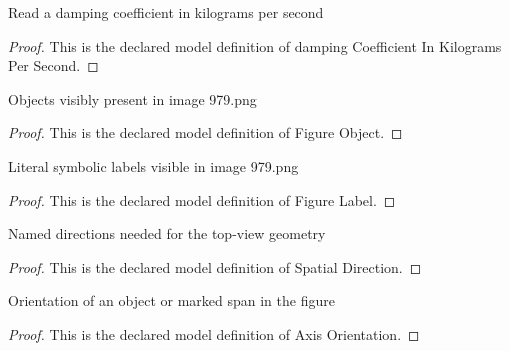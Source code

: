 \begin{definition}
  \label{def:physics:phyx-mini-0979:phyxminiproblems-problemphyxmini0979-dampingcoefficientinkilogramspersecond}
  Read a damping coefficient in kilograms per second
\end{definition}
\begin{proof}
  This is the declared model definition of damping Coefficient In Kilograms Per Second.
\end{proof}
\begin{definition}
  \label{def:physics:phyx-mini-0979:phyxminiproblems-problemphyxmini0979-figureobject}
  Objects visibly present in image 979.png
\end{definition}
\begin{proof}
  This is the declared model definition of Figure Object.
\end{proof}
\begin{definition}
  \label{def:physics:phyx-mini-0979:phyxminiproblems-problemphyxmini0979-figurelabel}
  Literal symbolic labels visible in image 979.png
\end{definition}
\begin{proof}
  This is the declared model definition of Figure Label.
\end{proof}
\begin{definition}
  \label{def:physics:phyx-mini-0979:phyxminiproblems-problemphyxmini0979-spatialdirection}
  Named directions needed for the top-view geometry
\end{definition}
\begin{proof}
  This is the declared model definition of Spatial Direction.
\end{proof}
\begin{definition}
  \label{def:physics:phyx-mini-0979:phyxminiproblems-problemphyxmini0979-axisorientation}
  Orientation of an object or marked span in the figure
\end{definition}
\begin{proof}
  This is the declared model definition of Axis Orientation.
\end{proof}
